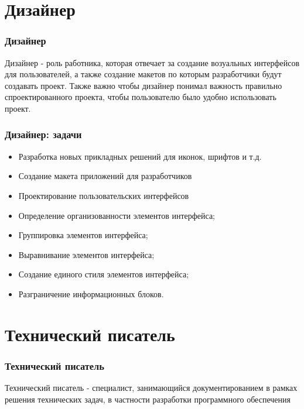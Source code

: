 \documentclass{../industrial-development}
\begin{document}
	\section{Дизайнер }
	
	\begin{frame} \frametitle{Дизайнер}
		\begin{block}{}
			\alert {Дизайнер} - роль работника, которая отвечает за создание возуальных интерфейсов для пользователей, а также создание макетов по которым разработчики будут создавать проект. Также важно чтобы дизайнер понимал важность правильно спроектированного проекта, чтобы пользователю было удобно использовать проект.
		\end{block}
		
	\end{frame}
	
	\begin{frame} \frametitle{Дизайнер: задачи}
			\begin{itemize}
				\item Разработка новых прикладных решений для иконок, шрифтов и т.д.
				\item Создание макета приложений для разработчиков
				\item Проектирование пользовательских интерфейсов
				\item Определение организованности элементов интерфейса;
				\item Группировка элементов интерфейса;
				\item Выравнивание элементов интерфейса;
				\item Создание единого стиля элементов интерфейса;
				\item Разграничение информационных блоков.
			\end{itemize}
	\end{frame}
	
	
	\section{Технический писатель }
	
	\begin{frame} \frametitle{Технический писатель}
		\begin{block}{}
			\alert {Технический писатель} - специалист, занимающийся документированием в рамках решения технических задач, в частности разработки программного обеспечения
		\end{block}
	\end{frame}
\end{document}
